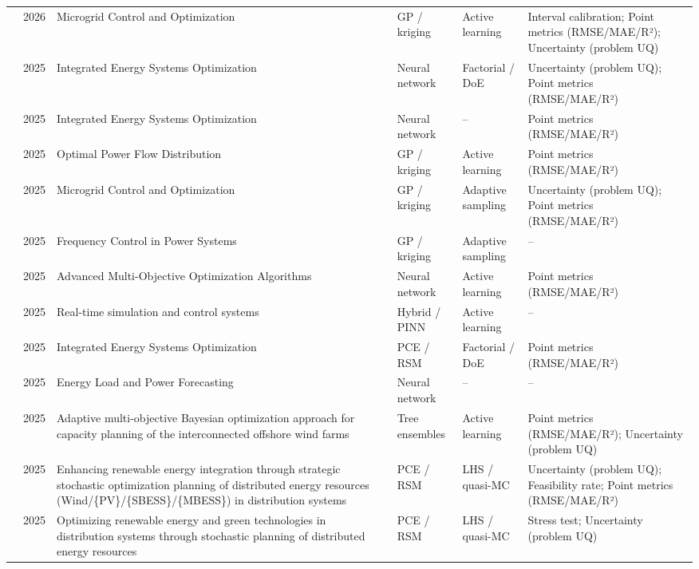 \begin{longtable}{@{}p{} p{} p{} p{} p{} p{}@{}}
  \cite{Matta2026} & 2026 & Microgrid Control and Optimization & GP / kriging & Active learning & Interval calibration; Point metrics (RMSE/MAE/R²); Uncertainty (problem UQ) \\
  \cite{Du2025} & 2025 & Integrated Energy Systems Optimization & Neural network & Factorial / DoE & Uncertainty (problem UQ); Point metrics (RMSE/MAE/R²) \\
  \cite{Franzoso2025} & 2025 & Integrated Energy Systems Optimization & Neural network & -- & Point metrics (RMSE/MAE/R²) \\
  \cite{Katkar2025} & 2025 & Optimal Power Flow Distribution & GP / kriging & Active learning & Point metrics (RMSE/MAE/R²) \\
  \cite{Kiani20253021} & 2025 & Microgrid Control and Optimization & GP / kriging & Adaptive sampling & Uncertainty (problem UQ); Point metrics (RMSE/MAE/R²) \\
  \cite{Prusty2025} & 2025 & Frequency Control in Power Systems & GP / kriging & Adaptive sampling & -- \\
  \cite{Reis2025} & 2025 & Advanced Multi-Objective Optimization Algorithms & Neural network & Active learning & Point metrics (RMSE/MAE/R²) \\
  \cite{Ren20252375} & 2025 & Real-time simulation and control systems & Hybrid / PINN & Active learning & -- \\
  \cite{Salahinezhad2025} & 2025 & Integrated Energy Systems Optimization & PCE / RSM & Factorial / DoE & Point metrics (RMSE/MAE/R²) \\
  \cite{Tian2025} & 2025 & Energy Load and Power Forecasting & Neural network & -- & -- \\
  \cite{Yang2025} & 2025 & Adaptive multi-objective Bayesian optimization approach for capacity planning of the interconnected offshore wind farms & Tree ensembles & Active learning & Point metrics (RMSE/MAE/R²); Uncertainty (problem UQ) \\
  \cite{alahmad_enhancing_2025} & 2025 & Enhancing renewable energy integration through strategic stochastic optimization planning of distributed energy resources (Wind/\{PV\}/\{SBESS\}/\{MBESS\}) in distribution systems & PCE / RSM & LHS / quasi-MC & Uncertainty (problem UQ); Feasibility rate; Point metrics (RMSE/MAE/R²) \\
  \cite{alahmad_optimizing_2025} & 2025 & Optimizing renewable energy and green technologies in distribution systems through stochastic planning of distributed energy resources & PCE / RSM & LHS / quasi-MC & Stress test; Uncertainty (problem UQ) \\

\end{longtable}
